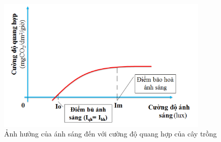 \documentclass[12pt]{report}
\begin{document}
\begin{flushleft}
	\begin{figure}[h!]
		\centering
		\includegraphics[width = 0.9\textwidth]{images/sodoanhsang.png}
		\caption{Ảnh hưởng của ánh sáng đến với cường độ quang hợp của cây trồng}
	\end{figure}
\end{flushleft}
\end{document}
